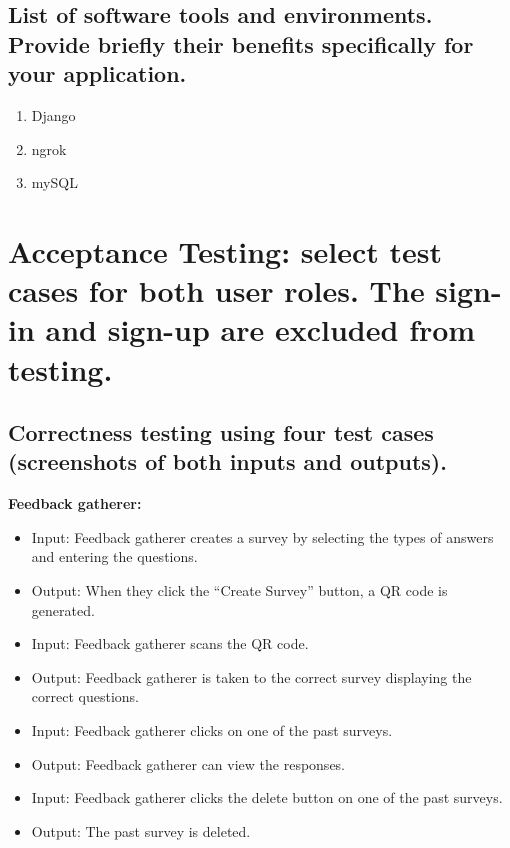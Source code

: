 \documentclass[letterpaper, 12 pt, conference]{ieeeconf}
\begin{document}
\subsection{List of software tools and environments. Provide briefly their benefits specifically for your application.}
\begin{enumerate}
   \item Django
   \item ngrok
   \item mySQL
\end{enumerate}


\section{Acceptance Testing: select test cases for both user roles. The sign-in and sign-up are excluded from testing.}
\subsection{Correctness testing using four test cases (screenshots of both inputs and outputs).}
\newline
\hfill

\textbf{Feedback gatherer:}
\begin{itemize}
    \item[] Input: Feedback gatherer creates a survey by selecting the types of answers and entering the questions. 
    \item[] Output: When they click the “Create Survey” button, a QR code is generated.
    \item[] Input: Feedback gatherer scans the QR code.
    \item[] Output: Feedback gatherer is taken to the correct survey displaying the correct questions.
    \item[] Input: Feedback gatherer clicks on one of the past surveys.
    \item[] Output: Feedback gatherer can view the responses.
    \item[] Input: Feedback gatherer clicks the delete button on one of the past surveys.
    \item[] Output: The past survey is deleted.
\end{itemize}
\end{document}
